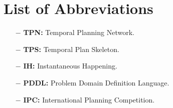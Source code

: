 \section*{\Huge List of Abbreviations}
\begin{itemize}
    \item[$-$] \textbf{TPN:} Temporal Planning Network.
    \item[$-$] \textbf{TPS:} Temporal Plan Skeleton. 
    \item[$-$] \textbf{IH:} Instantaneous Happening.
    \item[$-$] \textbf{PDDL:} Problem Domain Definition Language.
    \item[$-$] \textbf{IPC:} International Planning Competition.
\end{itemize}

\afterpage{\null\newpage}
